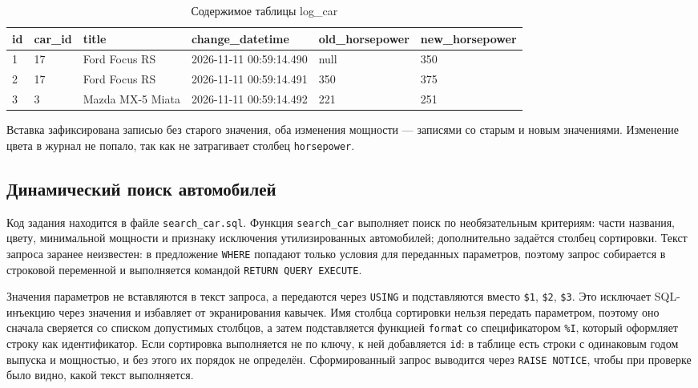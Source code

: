 \documentclass[oneside,a4paper,14pt]{extarticle}
\begin{document}
\begin{table}[H]
\centering
\footnotesize
\setlength{\tabcolsep}{3pt}
\caption{Содержимое таблицы log\_car}\label{tab:log}
\begin{tabular}{|l|l|l|l|l|l|}
\hline
\textbf{id} & \textbf{car\_\allowbreak id} & \textbf{title} & \textbf{change\_\allowbreak datetime} & \textbf{old\_\allowbreak horsepower} & \textbf{new\_\allowbreak horsepower} \\ \hline
1 & 17 & Ford Focus RS & 2026-11-11 00:59:14.490 & null & 350 \\ \hline
2 & 17 & Ford Focus RS & 2026-11-11 00:59:14.491 & 350 & 375 \\ \hline
3 & 3 & Mazda MX-5 Miata & 2026-11-11 00:59:14.492 & 221 & 251 \\ \hline
\end{tabular}
\end{table}

Вставка зафиксирована записью без старого значения, оба изменения мощности --- записями со старым и новым значениями. Изменение цвета в журнал не попало, так как не затрагивает столбец \texttt{horsepower}.

\subsection{Динамический поиск автомобилей}

Код задания находится в файле \texttt{search\_car.sql}. Функция \texttt{search\_car} выполняет поиск по необязательным критериям: части названия, цвету, минимальной мощности и признаку исключения утилизированных автомобилей; дополнительно задаётся столбец сортировки. Текст запроса заранее неизвестен: в предложение \texttt{WHERE} попадают только условия для переданных параметров, поэтому запрос собирается в строковой переменной и выполняется командой \texttt{RETURN QUERY EXECUTE}.

Значения параметров не вставляются в текст запроса, а передаются через \texttt{USING} и подставляются вместо \texttt{\$1}, \texttt{\$2}, \texttt{\$3}. Это исключает SQL-инъекцию через значения и избавляет от экранирования кавычек. Имя столбца сортировки нельзя передать параметром, поэтому оно сначала сверяется со списком допустимых столбцов, а затем подставляется функцией \texttt{format} со спецификатором \texttt{\%I}, который оформляет строку как идентификатор. Если сортировка выполняется не по ключу, к ней добавляется \texttt{id}: в таблице есть строки с одинаковым годом выпуска и мощностью, и без этого их порядок не определён. Сформированный запрос выводится через \texttt{RAISE NOTICE}, чтобы при проверке было видно, какой текст выполняется.
\end{document}
